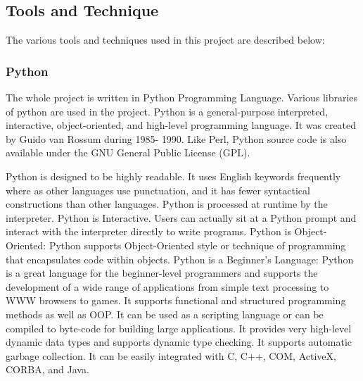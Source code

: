 \subsection{Tools and Technique}
The various tools and techniques used in this project are described below: 
\subsubsection{Python}
The whole project is written in Python Programming Language. Various libraries of python are used in the project. Python is a general-purpose interpreted, interactive, object-oriented, and high-level programming language. It was created by Guido van Rossum during 1985- 1990. Like Perl, Python source code is also available under the GNU General Public License (GPL).

Python is designed to be highly readable. It uses English keywords frequently where as other languages use punctuation, and it has fewer syntactical constructions than other languages. Python is processed at runtime by the interpreter. Python is Interactive. Users can actually sit at a Python prompt and interact with the interpreter directly to write programs. Python is Object-Oriented: Python supports Object-Oriented style or technique of programming that encapsulates code within objects. Python is a Beginner's Language: Python is a great language for the beginner-level programmers and supports the development of a wide range of applications from simple text processing to WWW browsers to games. It supports functional and structured programming methods as well as OOP. It can be used as a scripting language or can be compiled to byte-code for building large applications. It provides very high-level dynamic data types and supports dynamic type checking. It supports automatic garbage collection. It can be easily integrated with C, C++, COM, ActiveX, CORBA, and Java. 

